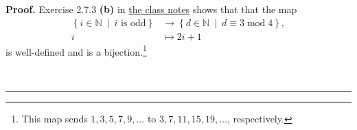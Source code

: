 \documentclass[paper=a4, fontsize=12pt]{scrartcl}%
\theoremstyle{plainsl}
\theoremstyle{definition}
\theoremstyle{remark}
\newenvironment{proof}[1][Proof]{\noindent\textbf{#1.} }{\ \rule{0.5em}{0.5em}}
\begin{document}
\begin{proof}
Exercise 2.7.3 \textbf{(b)} in
\href{http://www.cip.ifi.lmu.de/~grinberg/t/19s/notes.pdf}{the class notes}
shows that that the map%
\begin{align*}
\left\{  i\in\mathbb{N}\ \mid\ i\text{ is odd}\right\}   &  \rightarrow
\left\{  d\in\mathbb{N}\ \mid\ d\equiv3\operatorname{mod}4\right\}  ,\\
i  &  \mapsto2i+1
\end{align*}
is well-defined and is a bijection.\footnote{This map sends $1,3,5,7,9,\ldots$
to $3,7,11,15,19,\ldots$, respectively.}

\begin{comment}
\footnote{\textit{Proof (sketched):} Let us first show that this map is
well-defined. Indeed, if $i\in\mathbb{N}$ is odd, then $i=2q+1$ for some
integer $q$; thus, this integer $q$ satisfies $2\underbrace{i}_{=2q+1}%
+1=2\left(  2q+1\right)  +1=\underbrace{4q}_{\equiv0\operatorname{mod}%
4}+3\equiv3\operatorname{mod}4$. Hence, the map
\begin{align*}
\left\{  i\in\mathbb{N}\ \mid\ i\text{ is odd}\right\}   &  \rightarrow
\left\{  d\in\mathbb{N}\ \mid\ d\equiv3\operatorname{mod}4\right\}  ,\\
i  &  \mapsto2i+1
\end{align*}
is well-defined. In order to see that this map is a bijection, we only need to
construct an inverse. This is easily done: An inverse to this map is%
\begin{align*}
\left\{  d\in\mathbb{N}\ \mid\ d\equiv3\operatorname{mod}4\right\}   &
\rightarrow\left\{  i\in\mathbb{N}\ \mid\ i\text{ is odd}\right\}  ,\\
d  &  \mapsto\left(  d-1\right)  /2
\end{align*}
(again, it is straightforward to see that this is well-defined).}
\end{comment}



\end{proof}
\end{document}
